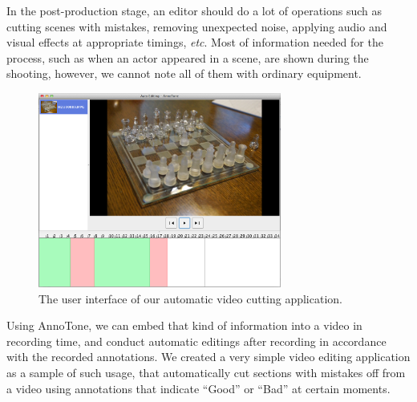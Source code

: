 In the post-production stage, an editor should do a lot of operations such as cutting scenes with mistakes, removing unexpected noise, applying audio and visual effects at appropriate timings, {\it etc}.
Most of information needed for the process, such as when an actor appeared in a scene, are shown during the shooting, however, we cannot note all of them with ordinary equipment.

\begin{figure}[htbp]
 \begin{center}
  \includegraphics[width=80mm]{application_edit.png}
 \end{center}
 \caption{The user interface of our automatic video cutting application.}
 \label{fig:appl_map}
\end{figure}

Using AnnoTone, we can embed that kind of information into a video in recording time, and conduct automatic editings after recording in accordance with the recorded annotations.
We created a very simple video editing application as a sample of such usage, that automatically cut sections with mistakes off from a video using annotations that indicate ``Good'' or ``Bad'' at certain moments.
